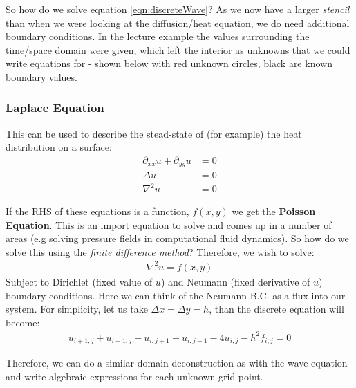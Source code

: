 \documentclass[11pt,a4paper]{report}
\begin{document}
	So how do we solve equation \ref{eqn:discreteWave}? As we now have a larger \textit{stencil} than when we were looking at the diffusion/heat equation, we do need additional boundary conditions. In the lecture example the values surrounding the time/space domain were given, which left the interior as unknowns that we could write equations for - shown below with red unknown circles, black are known boundary values.
	\begin{figure}[h!]
		\centering
	\end{figure}
	
	\subsubsection{Laplace Equation}
	This can be used to describe the stead-state of (for example) the heat distribution on a surface:
	\begin{align}
	\partial_{xx} u + \partial_{yy} u &= 0 \\
	\Delta u &= 0 \\
	\nabla^2 u &= 0 
	\end{align}
	
	If the RHS of these equations is a function, $f(x,y)$ we get the \textbf{Poisson Equation}. This is an import equation to solve and comes up in a number of areas (e.g solving pressure fields in computational fluid dynamics). So how do we solve this using the \textit{finite difference method}? Therefore, we wish to solve:
	\begin{align}
	\nabla^2 u = f(x,y)
	\end{align}
	Subject to Dirichlet (fixed value of $u$) and Neumann (fixed derivative of $u$) boundary conditions. Here we can think of the Neumann B.C. as a flux into our system. For simplicity, let us take $\Delta x = \Delta y = h$, than the discrete equation will become:
	\begin{align}
	u_{i+1,j} + u_{i-1,j} + u_{i,j+1} + u_{i,j-1} - 4u_{i,j} - h^2 f_{i,j} = 0
	\end{align}
	
	Therefore, we can do a similar domain deconstruction as with the wave equation and write algebraic expressions for each unknown grid point.
\end{document}
